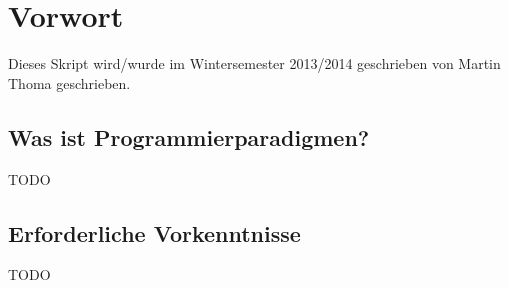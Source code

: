 \chapter*{Vorwort}
Dieses Skript wird/wurde im Wintersemester 2013/2014 geschrieben
von Martin Thoma geschrieben.

\section*{Was ist Programmierparadigmen?}

TODO

\section*{Erforderliche Vorkenntnisse}
TODO
